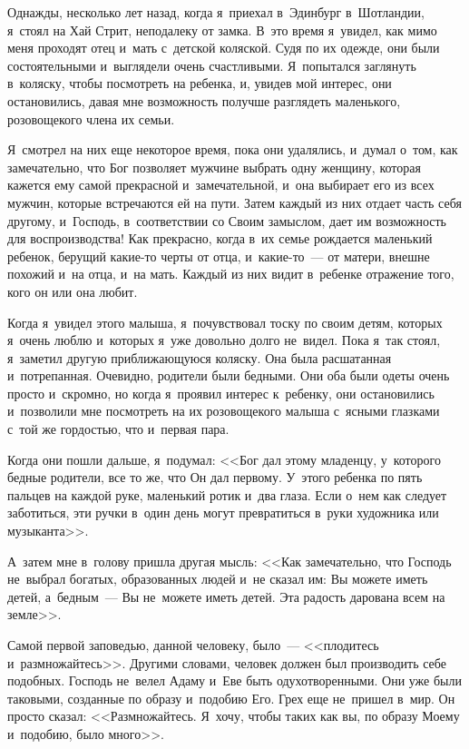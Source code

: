 \documentclass[12pt,article,a4paper,fittopage]{ncc}
\begin{document}
\begin{multicols}{2}

Однажды, несколько лет назад, когда я~приехал в~Эдинбург в~Шотландии, я~стоял на Хай Стрит, неподалеку от замка. В~это время я~увидел, как мимо меня проходят отец и~мать с~детской коляской. Судя по их одежде, они были состоятельными и~выглядели очень счастливыми. Я~попытался заглянуть в~коляску, чтобы посмотреть на ребенка, и, увидев мой интерес, они остановились, давая мне возможность получше разглядеть маленького, розовощекого члена их семьи.

Я~смотрел на них еще некоторое время, пока они удалялись, и~думал о~том, как замечательно, что Бог  позволяет мужчине выбрать одну женщину, которая кажется ему самой прекрасной и~замечательной, и~она выбирает его из всех мужчин, которые встречаются ей на пути. Затем каждый из них отдает часть себя другому, и~Господь, в~соответствии со Своим замыслом, дает им возможность для воспроизводства! Как прекрасно, когда в~их семье рождается маленький ребенок, берущий какие-то черты от отца, и~какие-то~--- от матери, внешне похожий и~на отца, и~на мать. Каждый из них видит в~ребенке отражение того, кого он или она любит.

Когда я~увидел этого малыша, я~почувствовал тоску по своим детям, которых я~очень люблю и~которых я~уже довольно долго не~видел. Пока я~так стоял, я~заметил другую приближающуюся коляску. Она была расшатанная и~потрепанная. Очевидно, родители были бедными. Они оба были одеты очень просто и~скромно, но когда я~проявил интерес к~ребенку, они остановились и~позволили мне посмотреть на их розовощекого малыша с~ясными глазками с~той же гордостью, что и~первая пара.

Когда они пошли дальше, я~подумал: <<Бог дал этому младенцу, у~которого бедные родители, все то же, что Он дал первому. У~этого ребенка по пять пальцев на каждой руке, маленький ротик и~два глаза. Если о~нем как следует заботиться, эти ручки в~один день могут превратиться в~руки художника или музыканта>>.

А~затем мне в~голову пришла другая мысль: <<Как замечательно, что Господь не~выбрал богатых, образованных людей и~не сказал им: \glqq Вы можете иметь детей\grqq{}, а~бедным~--- \glqq Вы не~можете иметь детей\grqq{}. Эта радость дарована всем на земле>>.

Самой первой заповедью, данной человеку, было~--- <<плодитесь и~размножайтесь>>. Другими словами, человек должен был производить себе подобных. Господь не~велел Адаму и~Еве быть одухотворенными. Они уже были таковыми, созданные по образу и~подобию Его. Грех еще не~пришел в~мир. Он просто сказал: <<Размножайтесь. Я~хочу, чтобы таких как вы, по образу Моему и~подобию, было много>>.


\end{multicols}
\end{document}
